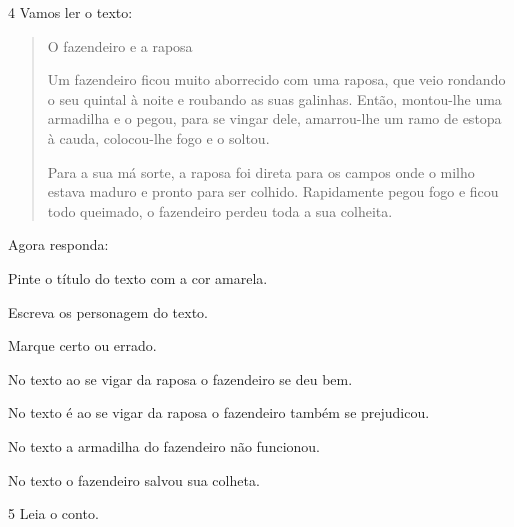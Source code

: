 \num{4} Vamos ler o texto:


\begin{quote}
O fazendeiro e a raposa

Um fazendeiro ficou muito aborrecido com uma raposa, que veio rondando o
seu quintal à noite e roubando as suas galinhas. Então, montou-lhe uma
armadilha e o pegou, para se vingar dele, amarrou-lhe um ramo de estopa
à cauda, colocou-lhe fogo e o soltou.

Para a sua má sorte, a raposa foi direta para os campos onde o milho
estava maduro e pronto para ser colhido. Rapidamente pegou fogo e ficou
todo queimado, o fazendeiro perdeu toda a sua colheita.
\end{quote}


Agora responda:

\begin{escolha}
\item Pinte o título do texto com a cor amarela.

\item Escreva os personagem do texto.


\item Marque certo ou errado.

\begin{boxlist}
\boxitem[] No texto ao se vigar da raposa o fazendeiro se deu bem.

\boxitem[] No texto é ao se vigar da raposa o fazendeiro também se prejudicou.

\boxitem[] No texto a armadilha do fazendeiro não funcionou.

\boxitem[] No texto o fazendeiro salvou sua colheta.
\end{boxlist}
\end{escolha}

\num{5} Leia o conto.


